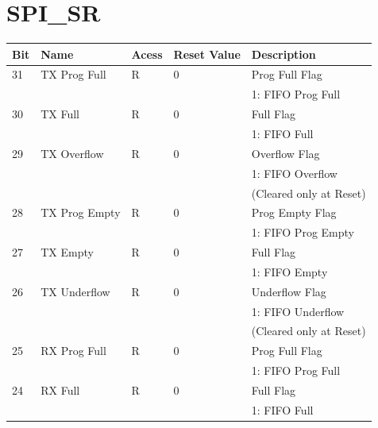 \section{SPI\_SR}
\begin{table} [!h]
	\centering
		\begin{tabularx} {160mm}{|p{1cm}|p{5cm}|p{1.5cm}|p{1cm}|X|} \hline
		\textbf{Bit}		& \textbf{Name}	& \textbf{Acess} & \textbf{Reset Value}	& \textbf{Description} 				\\ \hline
	  31							& TX Prog Full	& R							 & 0										& Prog Full Flag 	  					\\
	  								&								&								 &											& 1: FIFO Prog Full 					\\ \hline
	  30							& TX Full				& R							 & 0										& Full Flag 	  							\\
	  								&								&								 &											& 1: FIFO Full 								\\ \hline
	  29							& TX Overflow		& R							 & 0										& Overflow Flag 							\\
	  								&								&								 &											& 1: FIFO Overflow						\\ 
	  								&								&								 &											& (Cleared only at Reset)			\\ \hline	  		
	  28							& TX Prog Empty & R							 & 0										& Prog Empty Flag 	  				\\
	  								&								&								 &											& 1: FIFO Prog Empty 		 			\\ \hline
	  27							& TX Empty			& R							 & 0										& Full Flag 	  							\\
	  								&								&								 &											& 1: FIFO Empty								\\ \hline
	  26							& TX Underflow	& R							 & 0										& Underflow Flag 							\\
	  								&								&								 &											& 1: FIFO Underflow						\\ 
	  								&								&								 &											& (Cleared only at Reset)			\\ \hline	 
	  25							& RX Prog Full	& R							 & 0										& Prog Full Flag 	  					\\
	  								&								&								 &											& 1: FIFO Prog Full 					\\ \hline
	  24							& RX Full				& R							 & 0										& Full Flag 	  							\\
	  								&								&								 &											& 1: FIFO Full 								\\ \hline

\end{tabularx}
\end{table}
